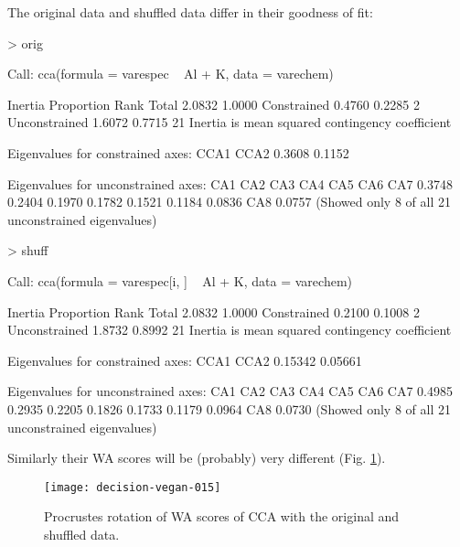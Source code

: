 \documentclass[a4paper,10pt,twocolumn]{article}
\begin{document}
The original data and shuffled data differ in their goodness of
fit:
\begin{Schunk}
\begin{Sinput}
> orig
\end{Sinput}
\begin{Soutput}
Call: cca(formula = varespec ~ Al + K, data =
varechem)

              Inertia Proportion Rank
Total          2.0832     1.0000     
Constrained    0.4760     0.2285    2
Unconstrained  1.6072     0.7715   21
Inertia is mean squared contingency coefficient 

Eigenvalues for constrained axes:
  CCA1   CCA2 
0.3608 0.1152 

Eigenvalues for unconstrained axes:
   CA1    CA2    CA3    CA4    CA5    CA6    CA7 
0.3748 0.2404 0.1970 0.1782 0.1521 0.1184 0.0836 
   CA8 
0.0757 
(Showed only 8 of all 21 unconstrained eigenvalues)
\end{Soutput}
\begin{Sinput}
> shuff
\end{Sinput}
\begin{Soutput}
Call: cca(formula = varespec[i, ] ~ Al + K, data
= varechem)

              Inertia Proportion Rank
Total          2.0832     1.0000     
Constrained    0.2100     0.1008    2
Unconstrained  1.8732     0.8992   21
Inertia is mean squared contingency coefficient 

Eigenvalues for constrained axes:
   CCA1    CCA2 
0.15342 0.05661 

Eigenvalues for unconstrained axes:
   CA1    CA2    CA3    CA4    CA5    CA6    CA7 
0.4985 0.2935 0.2205 0.1826 0.1733 0.1179 0.0964 
   CA8 
0.0730 
(Showed only 8 of all 21 unconstrained eigenvalues)
\end{Soutput}
\end{Schunk}
Similarly their WA scores will be (probably) very different
(Fig. \ref{fig:ccawa}).
\begin{figure}
\texttt{[image: decision-vegan-015]}
\caption{Procrustes rotation of WA scores of CCA with the original and
  shuffled data.}
\label{fig:ccawa}
\end{figure}
\end{document}
